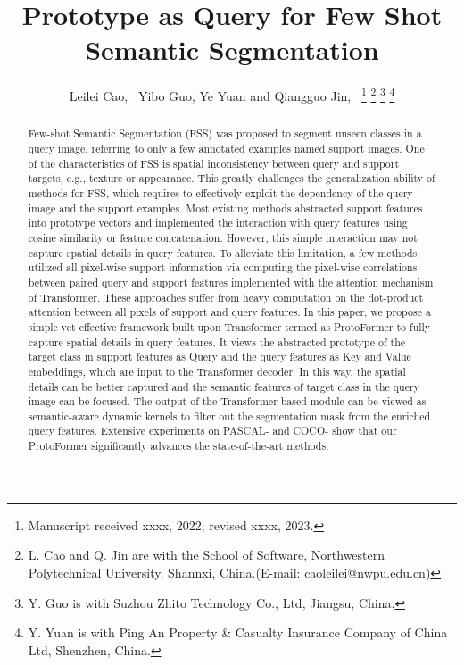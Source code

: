 \documentclass[journal]{IEEEtran}
\begin{document}
\title{Prototype as Query for Few Shot Semantic Segmentation}

\author{Leilei Cao,~
        Yibo Guo,
        Ye Yuan
        and Qiangguo Jin,~
\thanks{Manuscript received xxxx, 2022; revised xxxx, 2023.}
\thanks{L. Cao and Q. Jin are with the School
of Software, Northwestern Polytechnical University, Shannxi, China.(E-mail: caoleilei@nwpu.edu.cn)}
\thanks{Y. Guo is with Suzhou Zhito Technology Co., Ltd, Jiangsu, China.}
\thanks{Y. Yuan is with Ping An Property \& Casualty Insurance Company of China Ltd, Shenzhen, China.}
}


\maketitle

\begin{abstract}
Few-shot Semantic Segmentation (FSS) was proposed to segment unseen classes in a query image, referring to only a few annotated examples named support images. One of the characteristics of FSS is spatial inconsistency between query and support targets, e.g., texture or appearance. This greatly challenges the generalization ability of methods for FSS, which requires to effectively exploit the dependency of the query image and the support examples. Most existing methods abstracted support features into prototype vectors and implemented the interaction with query features using cosine similarity or feature concatenation. However, this simple interaction may not capture spatial details in query features. To alleviate this limitation, a few methods utilized all pixel-wise support information via computing the pixel-wise correlations between paired query and support features implemented with the attention mechanism of Transformer. These approaches suffer from heavy computation on the dot-product attention between all pixels of support and query features. In this paper, we propose a simple yet effective framework built upon Transformer termed as ProtoFormer to fully capture spatial details in query features. It views the abstracted prototype of the target class in support features as Query and the query features as Key and Value embeddings, which are input to the Transformer decoder. In this way, the spatial details can be better captured and the semantic features of target class in the query image can be focused. The output of the Transformer-based module can be viewed as semantic-aware dynamic kernels to filter out the segmentation mask from the enriched query features. Extensive experiments on PASCAL- and COCO- show that our ProtoFormer significantly advances the state-of-the-art methods.
\end{abstract}
\end{document}
